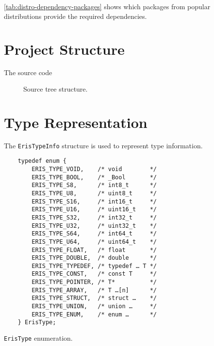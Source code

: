 \autoref{tab:distro-dependency-packages} shows which packages from
popular \GnuLinux* distributions provide the required dependencies.

\section{Project Structure}

The \Eris* source code

\begin{figure}[h]
    \centering
    \noindent\begin{minipage}{0.75\textwidth}
    \end{minipage}
    \caption{Source tree structure.}
\end{figure}


\section{Type Representation}

The \texttt{ErisTypeInfo} structure is used to represent type information.

\begin{listing}
    \centering
    \begin{verbatim}
	typedef enum {
	    ERIS_TYPE_VOID,    /* void        */
	    ERIS_TYPE_BOOL,    /* _Bool       */
	    ERIS_TYPE_S8,      /* int8_t      */
	    ERIS_TYPE_U8,      /* uint8_t     */
	    ERIS_TYPE_S16,     /* int16_t     */
	    ERIS_TYPE_U16,     /* uint16_t    */
	    ERIS_TYPE_S32,     /* int32_t     */
	    ERIS_TYPE_U32,     /* uint32_t    */
	    ERIS_TYPE_S64,     /* int64_t     */
	    ERIS_TYPE_U64,     /* uint64_t    */
	    ERIS_TYPE_FLOAT,   /* float       */
	    ERIS_TYPE_DOUBLE,  /* double      */
	    ERIS_TYPE_TYPEDEF, /* typedef … T */
	    ERIS_TYPE_CONST,   /* const T     */
	    ERIS_TYPE_POINTER, /* T*          */
	    ERIS_TYPE_ARRAY,   /* T …[n]      */
	    ERIS_TYPE_STRUCT,  /* struct …    */
	    ERIS_TYPE_UNION,   /* union …     */
	    ERIS_TYPE_ENUM,    /* enum …      */
	} ErisType;
    \end{verbatim}
    \caption{\texttt{ErisType} enumeration.}
    \label{lst:ErisType}
\end{listing}

